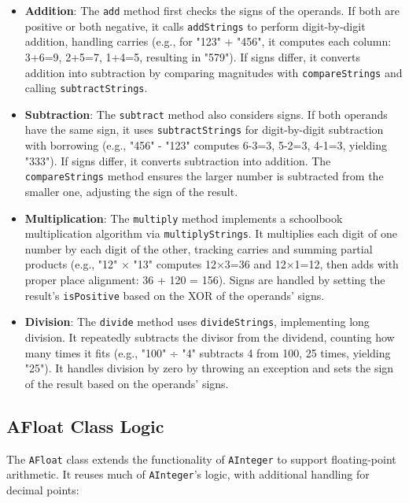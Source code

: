 \documentclass[a4paper,12pt]{article}
\begin{document}
\begin{itemize}
    \item \textbf{Addition}: The \texttt{add} method first checks the signs of the operands. If both are positive or both negative, it calls \texttt{addStrings} to perform digit-by-digit addition, handling carries (e.g., for "123" + "456", it computes each column: 3+6=9, 2+5=7, 1+4=5, resulting in "579"). If signs differ, it converts addition into subtraction by comparing magnitudes with \texttt{compareStrings} and calling \texttt{subtractStrings}.
    \item \textbf{Subtraction}: The \texttt{subtract} method also considers signs. If both operands have the same sign, it uses \texttt{subtractStrings} for digit-by-digit subtraction with borrowing (e.g., "456" - "123" computes 6-3=3, 5-2=3, 4-1=3, yielding "333"). If signs differ, it converts subtraction into addition. The \texttt{compareStrings} method ensures the larger number is subtracted from the smaller one, adjusting the sign of the result.
    \item \textbf{Multiplication}: The \texttt{multiply} method implements a schoolbook multiplication algorithm via \texttt{multiplyStrings}. It multiplies each digit of one number by each digit of the other, tracking carries and summing partial products (e.g., "12" × "13" computes 12×3=36 and 12×1=12, then adds with proper place alignment: 36 + 120 = 156). Signs are handled by setting the result's \texttt{isPositive} based on the XOR of the operands' signs.
    \item \textbf{Division}: The \texttt{divide} method uses \texttt{divideStrings}, implementing long division. It repeatedly subtracts the divisor from the dividend, counting how many times it fits (e.g., "100" ÷ "4" subtracts 4 from 100, 25 times, yielding "25"). It handles division by zero by throwing an exception and sets the sign of the result based on the operands' signs.
\end{itemize}

\subsection{AFloat Class Logic}
The \texttt{AFloat} class extends the functionality of \texttt{AInteger} to support floating-point arithmetic. It reuses much of \texttt{AInteger}'s logic, with additional handling for decimal points:
\end{document}
